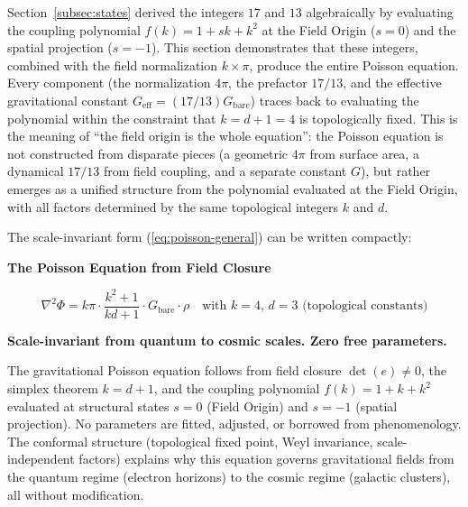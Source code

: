 \documentclass[aps,prd,preprint,superscriptaddress,showpacs,preprintnumbers,amsmath,amssymb,nofootinbib]{revtex4-2}
\begin{document}
Section~\ref{subsec:states} derived the integers $17$ and $13$ algebraically by evaluating the coupling polynomial $f(k) = 1 + sk + k^2$ at the Field Origin ($s=0$) and the spatial projection ($s=-1$). This section demonstrates that these integers, combined with the field normalization $k\times\pi$, produce the entire Poisson equation. Every component (the normalization $4\pi$, the prefactor $17/13$, and the effective gravitational constant $G_{\text{eff}} = (17/13)G_{\text{bare}}$) traces back to evaluating the polynomial within the constraint that $k = d+1 = 4$ is topologically fixed. This is the meaning of ``the field origin is the whole equation'': the Poisson equation is not constructed from disparate pieces (a geometric $4\pi$ from surface area, a dynamical $17/13$ from field coupling, and a separate constant $G$), but rather emerges as a unified structure from the polynomial evaluated at the Field Origin, with all factors determined by the same topological integers $k$ and $d$.

The scale-invariant form (\ref{eq:poisson-general}) can be written compactly:

\vspace{1.5em}
\noindent
\colorbox{resultgreen}{\parbox{\dimexpr\textwidth-2\fboxsep\relax}{%
\vspace{0.8em}
\centering
\textbf{\large The Poisson Equation from Field Closure}

\vspace{0.5em}
\boldmath
\begin{equation}
\nabla^2\Phi = k\pi \cdot \frac{k^2+1}{kd+1} \cdot G_{\text{bare}} \cdot \rho
\quad \text{with } k=4, \, d=3 \text{ (topological constants)}
\label{eq:poisson-boxed}
\end{equation}
\unboldmath

\vspace{0.3em}
\textbf{Scale-invariant from quantum to cosmic scales. Zero free parameters.}
\vspace{0.5em}}}
\vspace{1.5em}

The gravitational Poisson equation follows from field closure $\det(e) \neq 0$, the simplex theorem $k = d+1$, and the coupling polynomial $f(k) = 1 + k + k^2$ evaluated at structural states $s=0$ (Field Origin) and $s=-1$ (spatial projection). No parameters are fitted, adjusted, or borrowed from phenomenology. The conformal structure (topological fixed point, Weyl invariance, scale-independent factors) explains why this equation governs gravitational fields from the quantum regime (electron horizons) to the cosmic regime (galactic clusters), all without modification.
\end{document}
